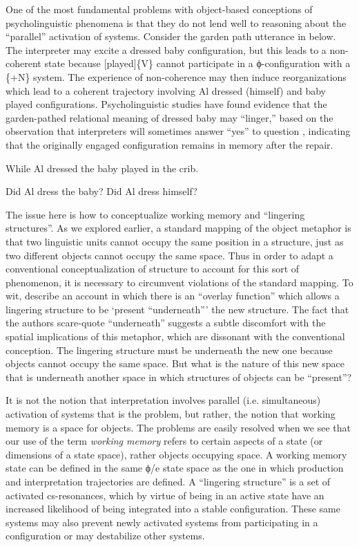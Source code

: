 One of the most fundamental problems with object-based conceptions of psycholinguistic phenomena is that they do not lend well to reasoning about the “parallel” activation of systems. Consider the garden path utterance in  below. The interpreter may excite a {\textbar}dressed baby{\textbar} configuration, but this leads to a non-coherent state because [played]\{V\} cannot participate in a ϕ-configuration with a \{+N\} system. The experience of non-coherence may then induce reorganizations which lead to a coherent trajectory involving {\textbar}Al dressed (himself){\textbar} and {\textbar}baby played{\textbar} configurations. Psycholinguistic studies have found evidence that the garden-pathed relational meaning of {\textbar}dressed baby{\textbar} may “linger,” based on the observation that interpreters will sometimes answer “yes” to question  \citep{SlatteryEtAl2013}, indicating that the originally engaged configuration remains in memory after the repair.

\ea\label{ex:6:1ter}
{While Al dressed the baby played in the crib.}
\z

\ea
\ea \label{ex:6:2tera} {Did Al dress the baby?}
\ex \label{ex:6:2terb }{Did Al dress himself?}
\z
\z

The issue here is how to conceptualize working memory and “lingering structures”. As we explored earlier, a standard mapping of the object metaphor is that two linguistic units cannot occupy the same position in a structure, just as two different objects cannot occupy the same space. Thus in order to adapt a conventional conceptualization of structure to account for this sort of phenomenon, it is necessary to circumvent violations of the standard mapping. To wit, \citet{SlatteryEtAl2013} describe an account in which there is an “overlay function” which allows a lingering structure to be ‘present “underneath”’ the new structure. The fact that the authors scare-quote “underneath” suggests a subtle discomfort with the spatial implications of this metaphor, which are dissonant with the conventional conception. The lingering structure must be underneath the new one because objects cannot occupy the same space. But what is the nature of this new space that is underneath another space in which structures of objects can be “present”?

It is not the notion that interpretation involves parallel (i.e. simultaneous) activation of systems that is the problem, but rather, the notion that working memory is a space for objects. The problems are easily resolved when we see that our use of the term \textit{working memory} refers to certain aspects of a state (or dimensions of a state space), rather objects occupying space. A working memory state can be defined in the same ϕ/e state space as the one in which production and interpretation trajectories are defined. A “lingering structure” is a set of activated cs-resonances, which by virtue of being in an active state have an increased likelihood of being integrated into a stable configuration. These same systems may also prevent newly activated systems from participating in a configuration or may destabilize other systems.

